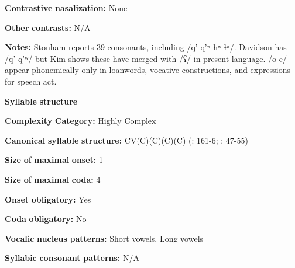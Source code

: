 \begin{styleBody}
\textbf{Contrastive} \textbf{nasalization:} None
\end{styleBody}

\begin{styleBody}
\textbf{Other} \textbf{contrasts:} N/A
\end{styleBody}

\begin{styleBody}
\textbf{Notes:} Stonham reports 39 consonants, including /q’ q’ʷ ħʷ ɬʷ/. Davidson has /q’ q’ʷ/ but Kim shows these have merged with /ʕ/ in present language. /o e/ appear phonemically only in loanwords, vocative constructions, and expressions for speech act.
\end{styleBody}

\begin{styleBody}
\textbf{Syllable} \textbf{structure}
\end{styleBody}

\begin{styleBody}
\textbf{Complexity} \textbf{Category:} Highly Complex
\end{styleBody}

\begin{styleBody}
\textbf{Canonical} \textbf{syllable} \textbf{structure:} CV(C)(C)(C)(C) (\citealt{Kim2003}: 161-6; \citealt{Stonham1999}: 47-55)
\end{styleBody}

\begin{styleBody}
\textbf{Size} \textbf{of} \textbf{maximal} \textbf{onset:} 1
\end{styleBody}

\begin{styleBody}
\textbf{Size} \textbf{of} \textbf{maximal} \textbf{coda:} 4
\end{styleBody}

\begin{styleBody}
\textbf{Onset} \textbf{obligatory:} Yes
\end{styleBody}

\begin{styleBody}
\textbf{Coda} \textbf{obligatory:} No
\end{styleBody}

\begin{styleBody}
\textbf{Vocalic} \textbf{nucleus} \textbf{patterns:} Short vowels, Long vowels
\end{styleBody}

\begin{styleBody}
\textbf{Syllabic} \textbf{consonant} \textbf{patterns:} N/A
\end{styleBody}

